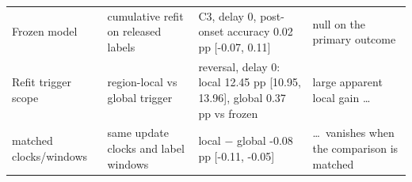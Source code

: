 \begin{table}[t]
\begin{tabular}{L{3.3cm}L{4.2cm}L{4.6cm}L{4.4cm}}
Frozen model & cumulative refit on released labels & C3, delay 0, post-onset accuracy 0.02 pp [-0.07, 0.11] & null on the primary outcome \\
Refit trigger scope & region-local vs global trigger & reversal, delay 0: local 12.45 pp [10.95, 13.96], global 0.37 pp vs frozen & large apparent local gain \ldots \\
\quad matched clocks/windows & same update clocks and label windows & local $-$ global -0.08 pp [-0.11, -0.05] & \ldots\ vanishes when the comparison is matched \\
\bottomrule
\end{tabular}
\end{table}
